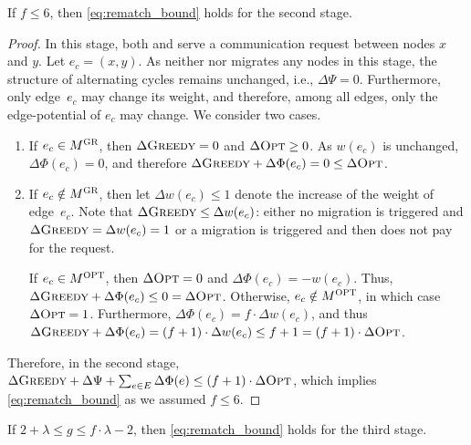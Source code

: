 \begin{lemma}
\label{lem:rematch_req}
If $f \leq 6$, then \eqref{eq:rematch_bound} holds for the second stage.
\end{lemma}

\begin{proof}
In this stage, both \GREEDY and \OPT serve a communication request between
nodes $x$ and $y$. Let $e_c = (x,y)$. As neither \GREEDY nor \OPT migrates any
nodes in this stage, the structure of alternating cycles remains
unchanged, i.e., $\Delta \Psi = 0$. Furthermore, only edge~$e_c$ may change its
weight, and therefore, among all edges, only the edge-potential of $e_c$ may
change. We consider two cases.
\begin{enumerate}

\item If $e_c \in M^\textsc{GR}$, then $\Delta \textsc{Greedy} = 0$ and $\Delta \textsc{Opt} \geq 0$. As
$w(e_c)$ is unchanged, $\Delta \Phi(e_c) = 0$, and therefore 
$\Delta \textsc{Greedy} + \Delta \Phi(e_c) = 0 \leq \Delta \textsc{Opt}$. 

\item If $e_c \notin M^\textsc{GR}$, then let $\Delta w(e_c) \leq 1$ denote the increase 
of the weight of edge~$e_c$. Note that $\Delta \textsc{Greedy} \leq \Delta w(e_c)$: 
either no migration is triggered and $\Delta \textsc{Greedy} = \Delta w(e_c) = 1$
or a migration is triggered and then \GREEDY does not pay for the request.

If $e_c \in M^\textsc{OPT}$, then $\Delta \textsc{Opt} = 0$ and $\Delta \Phi(e_c) = -w(e_c)$.
Thus, $\Delta \textsc{Greedy} + \Delta \Phi(e_c) \leq 0 = \Delta \textsc{Opt}$. Otherwise, 
$e_c \notin M^\textsc{OPT}$, in which case 
$\Delta \textsc{Opt} = 1$. Furthermore, $\Delta \Phi(e_c) = f \cdot \Delta w(e_c)$,
and thus $\Delta \textsc{Greedy} + \Delta \Phi(e_c) = (f+1) \cdot \Delta w(e_c) \leq f+1 =
(f+1) \cdot \Delta \textsc{Opt}$.
\end{enumerate}

Therefore, in the second stage, $\Delta \textsc{Greedy} + \Delta \Psi + \sum_{e \in E}
\Delta \Phi(e) \leq (f+1) \cdot \Delta \textsc{Opt}$,
which implies \eqref{eq:rematch_bound} as we assumed $f \leq 6$.
\end{proof}


\begin{lemma}
\label{lem:greedy_swap}
If $2 + \lambda \leq g \leq f \cdot \lambda - 2$, 
then  \eqref{eq:rematch_bound} holds for the third stage.
\end{lemma}




